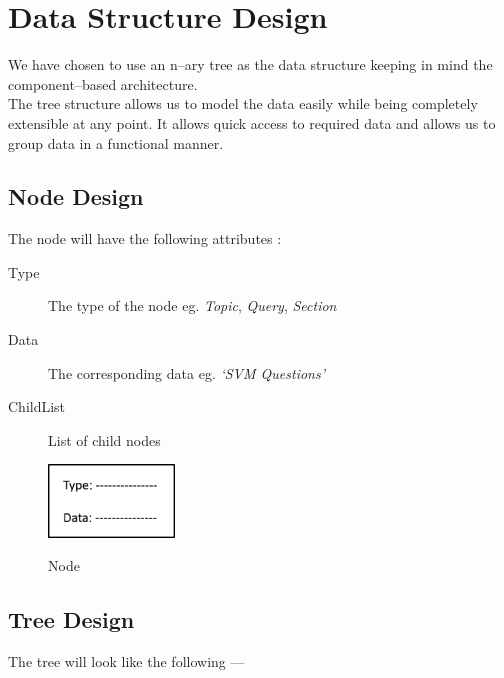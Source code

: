 \documentclass[a4paper,10pt]{report}
\begin{document}
\clearpage


\chapter{Data Structure Design}

We have chosen to use an n--ary tree as the data structure keeping in mind the component--based architecture. \\

The tree structure allows us to model the data easily while being completely extensible at any point. 
It allows quick access to required data and allows us to group data in a functional manner. 

\section{Node Design}

The node will have the following attributes : 
\begin{description}
	\item[Type] The type of the node eg. \emph{Topic}, \emph{Query}, \emph{Section}
	\item[Data] The corresponding data eg.\emph{ `SVM Questions'}
	\item[ChildList] List of child nodes
\end{description}

\begin{figure}[h!]
\centering
\includegraphics[width=0.30\textwidth]{./diagrams/node}\\
\caption{Node}
\end{figure}

\clearpage 

\section{Tree Design}

The tree will look like the following --- \\
\end{document}
